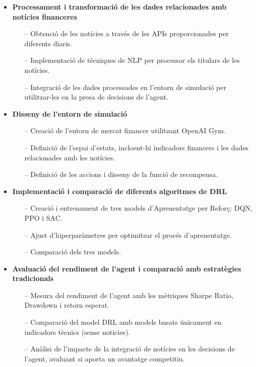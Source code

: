 \documentclass[12pt,a4paper,twoside]{book}
\begin{document}
\begin{itemize}
    \item \textbf{Processament i transformació de les dades relacionades amb notícies financeres}  
    \begin{itemize}
        \item[--] Obtenció de les notícies a través de les APIs proporcionades per diferents diaris.  
        \item[--] Implementació de tècniques de NLP per processar els titulars de les notícies.  
        \item[--] Integració de les dades processades en l’entorn de simulació per utilitzar-les en la presa de decisions de l’agent.  
    \end{itemize}
    
    \item \textbf{Disseny de l'entorn de simulació}  
    \begin{itemize}
        \item[--] Creació de l'entorn de mercat financer utilitzant OpenAI Gym\cite{OpenAIGym}.  
        \item[--] Definició de l’espai d’estats, incloent-hi indicadors financers i les dades relacionades amb les notícies.  
        \item[--] Definició de les accions i disseny de la funció de recompensa.
    \end{itemize}  
    
    \item \textbf{Implementació i comparació de diferents algoritmes de DRL}  
    \begin{itemize}
        \item[--] Creació i entrenament de tres models d’Aprenentatge per Reforç: DQN, PPO i SAC.  
        \item[--] Ajust d’hiperparàmetres per optimitzar el procés d’aprenentatge.  
        \item[--] Comparació dels tres models.  
    \end{itemize}  
    
    \item \textbf{Avaluació del rendiment de l'agent i comparació amb estratègies tradicionals}  
    \begin{itemize}
        \item[--] Mesura del rendiment de l’agent amb les mètriques Sharpe Ratio, Drawdown i retorn esperat.  
        \item[--] Comparació del model DRL amb models basats únicament en indicadors tècnics (sense noticies).  
        \item[--] Anàlisi de l'impacte de la integració de notícies en les decisions de l’agent, avaluant si aporta un avantatge competitiu.  
    \end{itemize}  
\end{itemize}  
\end{document}

